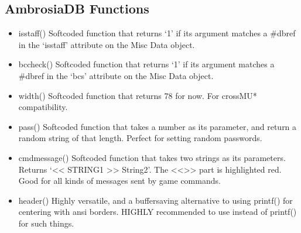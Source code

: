 \documentclass[letterpaper,10pt,english]{sphinxmanual}
\begin{document}
\subsection{AmbrosiaDB Functions}
\label{\detokenize{ambrosiadb:ambrosiadb-functions}}\begin{itemize}
\item {} 
\sphinxAtStartPar
isstaff() \sphinxhyphen{} Softcoded function that returns ‘1’ if its argument matches
a \#dbref in the ‘isstaff’ attribute on the Misc Data object.

\item {} 
\sphinxAtStartPar
bccheck() \sphinxhyphen{} Softcoded function that returns ‘1’ if its argument matches
a \#dbref in the ‘bcs’ attribute on the Misc Data object.

\item {} 
\sphinxAtStartPar
width() \sphinxhyphen{} Softcoded function that returns 78 for now. For cross\sphinxhyphen{}MU*
compatibility.

\item {} 
\sphinxAtStartPar
pass() \sphinxhyphen{} Softcoded function that takes a number as its parameter, and return
a random string of that length. Perfect for setting random passwords.

\item {} 
\sphinxAtStartPar
cmdmessage() \sphinxhyphen{} Softcoded function that takes two strings as its parameters.
Returns ‘\textless{}\textless{} STRING1 \textgreater{}\textgreater{} String2’. The \textless{}\textless{}\textgreater{}\textgreater{} part is highlighted red. Good for
all kinds of messages sent by game commands.

\item {} 
\sphinxAtStartPar
header() \sphinxhyphen{} Highly versatile, and a buffer\sphinxhyphen{}saving alternative
to using printf() for centering with ansi borders. HIGHLY recommended to use
instead of printf() for such things.

\end{itemize}
\end{document}
